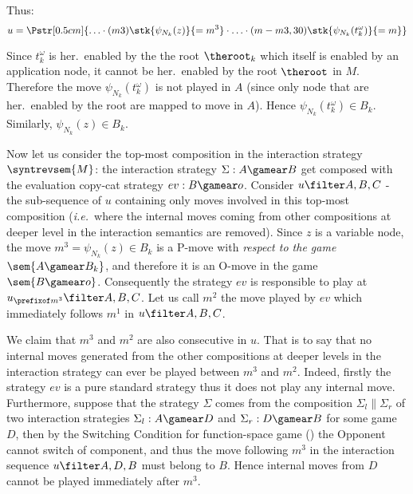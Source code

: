 \begin{itemize}[$\bullet$]
\begin{enumerate}
\begin{itemize}
\begin{enumerate}[(a)]
        Thus:
        $$u = \Pstr[0.5cm]{ \ldots \cdot (m3){\stk{\psi_{N_k}(z)}{=m^3}} \cdot
                    \ldots \cdot (m-m3,30){\stk{\psi_{N_k}(t_k^\omega)}{=m}} } $$



        Since $t_k^\omega$ is her.\ enabled by the the root $\theroot_k$ which itself is enabled by an application node, it cannot be her.\ enabled by the root $\theroot$ in $M$. Therefore the move $\psi_{N_k}(t_k^\omega)$ is not played in $A$ (since only node that are her.\ enabled by the root are mapped to move in $A$). Hence $\psi_{N_k}(t_k^\omega) \in B_k$. Similarly, $\psi_{N_k}(z) \in B_k$.

        Now let us consider the top-most composition in the interaction strategy $\syntrevsem{M}$: the interaction strategy $\Sigma: A \gamear B$ get composed with the evaluation copy-cat strategy $ev:B \gamear o$. Consider $ u \filter A,B,C$ - the sub-sequence of $u$ containing only moves involved in this top-most composition ({\it i.e.}\ where the internal moves coming from other compositions at deeper level in the interaction semantics are removed). Since $z$ is a variable node, the move $m^3 = \psi_{N_k}(z) \in B_k$ is a P-move with \emph{respect to the game} $\sem{A \gamear B_k}$, and therefore it is an O-move in the game $\sem{B \gamear o}$. Consequently the strategy $ev$ is responsible to play at $u_{\prefixof m^3} \filter A, B, C$. Let us call $m^2$ the move played by $ev$ which immediately follows $m^1$ in $u\filter A,B,C$.

        We claim that $m^3$ and $m^2$ are also consecutive in $u$. That is to say that no internal moves generated from the        other compositions at deeper levels in the interaction strategy can ever be played between $m^3$ and $m^2$. Indeed, firstly the strategy $ev$ is a pure standard strategy thus it does not play any internal move. Furthermore, suppose that the strategy $\Sigma$ comes from the composition $\Sigma_l \| \Sigma_r$ of two interaction strategies $\Sigma_l: A \gamear D$ and $\Sigma_r: D\gamear B$ for some game $D$, then by the Switching Condition for function-space game (\cite{hylandong_pcf}) the Opponent cannot switch of component, and thus the move following $m^3$ in the interaction sequence $u \filter A,D,B$ must belong to $B$. Hence internal moves from $D$ cannot be played immediately after $m^3$.


\end{enumerate}
\end{itemize}
\end{enumerate}
\end{itemize}
